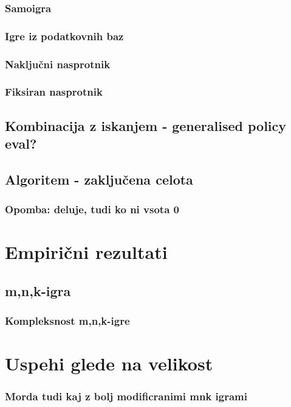 \documentclass[12pt,a4paper]{amsart}
\theoremstyle{definition} %
\theoremstyle{plain} %
\begin{document}
\subsubsection{Samoigra}
\subsubsection{Igre iz podatkovnih baz}
\subsubsection{Naključni nasprotnik}
\subsubsection{Fiksiran nasprotnik}

\subsection{Kombinacija z iskanjem - generalised policy eval?}

\subsection{Algoritem - zaključena celota}
\subsubsection{Opomba: deluje, tudi ko ni vsota 0}


\section{Empirični rezultati}

\subsection{m,n,k-igra}
\subsubsection{Kompleksnost m,n,k-igre}

\section{Uspehi glede na velikost}
\subsubsection{Morda tudi kaj z bolj modificranimi mnk igrami}
\end{document}
